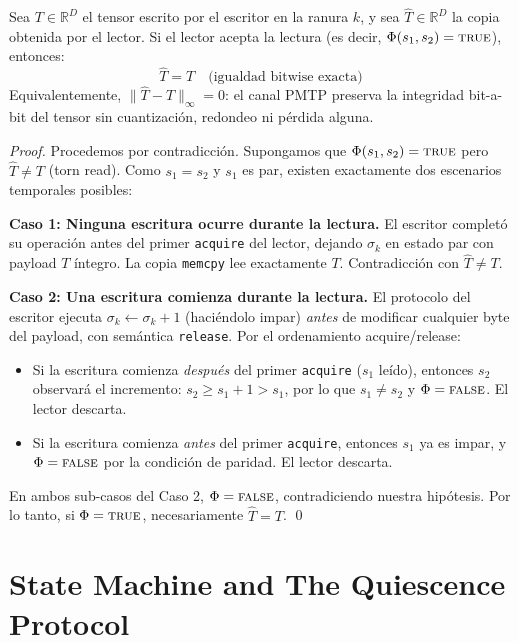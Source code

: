 \begin{theorem}
\label{thm:pmtp_integrity}
Sea $T \in \mathbb{R}^D$ el tensor escrito por el escritor en la ranura $k$, y sea 
$\hat{T} \in \mathbb{R}^D$ la copia obtenida por el lector. Si el lector acepta
la lectura (es decir, $\Phi(s_1, s_2) = \textsc{true}$), entonces:
\begin{equation}
\hat{T} = T \quad \text{(igualdad bitwise exacta)}
\end{equation}
Equivalentemente, $\| \hat{T} - T \|_\infty = 0$: el canal PMTP preserva la
integridad bit-a-bit del tensor sin cuantización, redondeo ni pérdida alguna.
\end{theorem}

\begin{proof}
Procedemos por contradicción. Supongamos que $\Phi(s_1, s_2) = \textsc{true}$
pero $\hat{T} \neq T$ (torn read). Como $s_1 = s_2$ y $s_1$ es par, existen
exactamente dos escenarios temporales posibles:

\textbf{Caso 1: Ninguna escritura ocurre durante la lectura.} 
El escritor completó su operación antes del primer \texttt{acquire} del lector,
dejando $\sigma_k$ en estado par con payload $T$ íntegro. La copia 
\texttt{memcpy} lee exactamente $T$. Contradicción con $\hat{T} \neq T$.

\textbf{Caso 2: Una escritura comienza durante la lectura.}
El protocolo del escritor ejecuta $\sigma_k \leftarrow \sigma_k + 1$ (haciéndolo
impar) \emph{antes} de modificar cualquier byte del payload, con semántica
\texttt{release}. Por el ordenamiento acquire/release:
\begin{itemize}
    \item Si la escritura comienza \emph{después} del primer \texttt{acquire}
    ($s_1$ leído), entonces $s_2$ observará el incremento:
    $s_2 \geq s_1 + 1 > s_1$, por lo que $s_1 \neq s_2$ y 
    $\Phi = \textsc{false}$. El lector descarta.
    \item Si la escritura comienza \emph{antes} del primer \texttt{acquire},
    entonces $s_1$ ya es impar, y $\Phi = \textsc{false}$ por la condición
    de paridad. El lector descarta.
\end{itemize}

En ambos sub-casos del Caso 2, $\Phi = \textsc{false}$, contradiciendo nuestra 
hipótesis. Por lo tanto, si $\Phi = \textsc{true}$, necesariamente 
$\hat{T} = T$. \qed
\end{proof}

\section{State Machine and The Quiescence Protocol}

